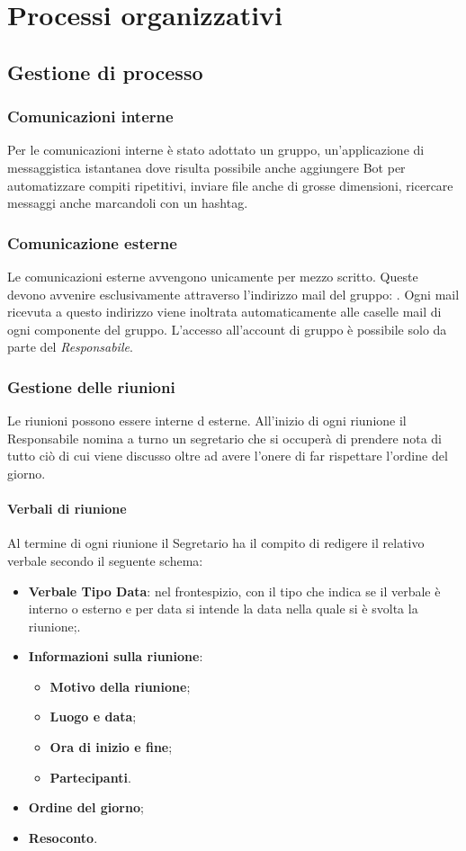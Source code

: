 \chapter{Processi organizzativi}
\section{Gestione di processo}
\subsection{Comunicazioni interne}
Per le comunicazioni interne è stato adottato un gruppo, un'applicazione di messaggistica istantanea dove risulta possibile anche aggiungere Bot per automatizzare compiti ripetitivi, inviare file anche di grosse dimensioni, ricercare messaggi anche marcandoli con un hashtag.
\subsection{Comunicazione esterne}
Le comunicazioni esterne avvengono unicamente per mezzo scritto. 
Queste devono avvenire esclusivamente attraverso l'indirizzo mail del gruppo: \mailzeroseven.
Ogni mail ricevuta a questo indirizzo viene inoltrata automaticamente alle caselle mail di ogni componente del gruppo. L'accesso all'account di gruppo è possibile solo da parte del \textit{Responsabile}.
\subsection{Gestione delle riunioni}
Le riunioni possono essere interne d esterne. 
All'inizio di ogni riunione il Responsabile nomina a turno un segretario che si occuperà di prendere nota di tutto ciò di cui viene discusso oltre ad avere l'onere di far rispettare l'ordine del giorno.
\subsubsection{Verbali di riunione}
Al termine di ogni riunione il Segretario ha il compito di redigere il relativo verbale secondo il seguente schema:
\begin{itemize}
	\item \textbf{Verbale Tipo Data}: nel frontespizio, con il tipo che indica se il verbale è interno o esterno e per data si intende la data nella quale si è svolta la riunione;.
	\item \textbf{Informazioni sulla riunione}:
	\begin{itemize}
			\item \textbf{Motivo della riunione};
			\item \textbf{Luogo e data};
			\item \textbf{Ora di inizio e fine};
			\item \textbf{Partecipanti}.
	\end{itemize}
	\item \textbf{Ordine del giorno};
	\item \textbf{Resoconto}.
\end{itemize}
